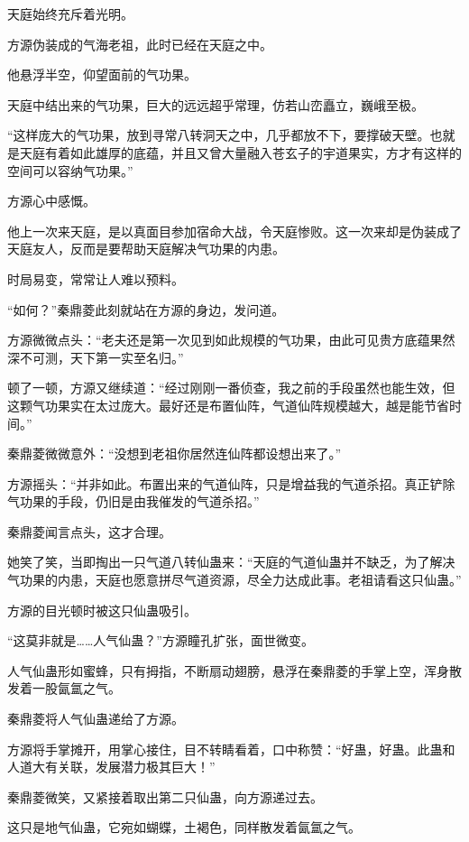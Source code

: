 
\begin{this_body}

天庭始终充斥着光明。

方源伪装成的气海老祖，此时已经在天庭之中。

他悬浮半空，仰望面前的气功果。

天庭中结出来的气功果，巨大的远远超乎常理，仿若山峦矗立，巍峨至极。

“这样庞大的气功果，放到寻常八转洞天之中，几乎都放不下，要撑破天壁。也就是天庭有着如此雄厚的底蕴，并且又曾大量融入苍玄子的宇道果实，方才有这样的空间可以容纳气功果。”

方源心中感慨。

他上一次来天庭，是以真面目参加宿命大战，令天庭惨败。这一次来却是伪装成了天庭友人，反而是要帮助天庭解决气功果的内患。

时局易变，常常让人难以预料。

“如何？”秦鼎菱此刻就站在方源的身边，发问道。

方源微微点头：“老夫还是第一次见到如此规模的气功果，由此可见贵方底蕴果然深不可测，天下第一实至名归。”

顿了一顿，方源又继续道：“经过刚刚一番侦查，我之前的手段虽然也能生效，但这颗气功果实在太过庞大。最好还是布置仙阵，气道仙阵规模越大，越是能节省时间。”

秦鼎菱微微意外：“没想到老祖你居然连仙阵都设想出来了。”

方源摇头：“并非如此。布置出来的气道仙阵，只是增益我的气道杀招。真正铲除气功果的手段，仍旧是由我催发的气道杀招。”

秦鼎菱闻言点头，这才合理。

她笑了笑，当即掏出一只气道八转仙蛊来：“天庭的气道仙蛊并不缺乏，为了解决气功果的内患，天庭也愿意拼尽气道资源，尽全力达成此事。老祖请看这只仙蛊。”

方源的目光顿时被这只仙蛊吸引。

“这莫非就是……人气仙蛊？”方源瞳孔扩张，面世微变。

人气仙蛊形如蜜蜂，只有拇指，不断扇动翅膀，悬浮在秦鼎菱的手掌上空，浑身散发着一股氤氲之气。

秦鼎菱将人气仙蛊递给了方源。

方源将手掌摊开，用掌心接住，目不转睛看着，口中称赞：“好蛊，好蛊。此蛊和人道大有关联，发展潜力极其巨大！”

秦鼎菱微笑，又紧接着取出第二只仙蛊，向方源递过去。

这只是地气仙蛊，它宛如蝴蝶，土褐色，同样散发着氤氲之气。


\end{this_body}
